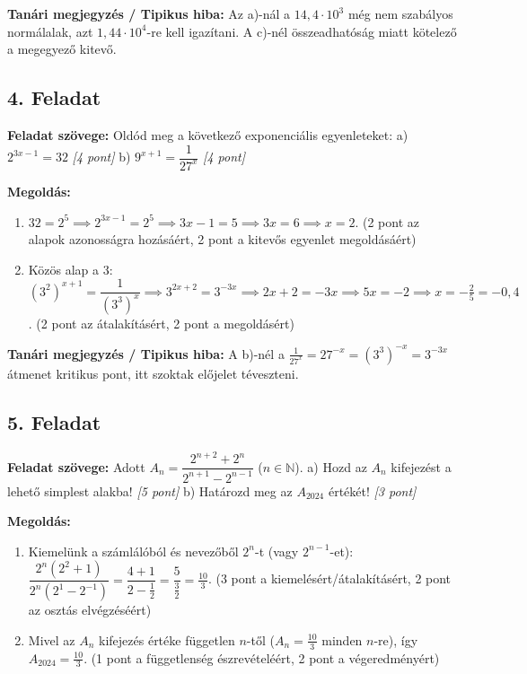 \documentclass[11pt,a4paper]{article}
\begin{document}
\noindent\textbf{Tanári megjegyzés / Tipikus hiba:} 
Az a)-nál a $14,4 \cdot 10^3$ még nem szabályos normálalak, azt $1,44 \cdot 10^4$-re kell igazítani. A c)-nél összeadhatóság miatt kötelező a megegyező kitevő.

\subsection*{4. Feladat}
\textbf{Feladat szövege:} Oldód meg a következő exponenciális egyenleteket:
a) $2^{3x-1} = 32$ \hfill \textit{[4 pont]}
b) $9^{x+1} = \dfrac{1}{27^x}$ \hfill \textit{[4 pont]}

\textbf{Megoldás:}
\begin{enumerate}
    \item[a)] $32 = 2^5 \implies 2^{3x-1} = 2^5 \implies 3x - 1 = 5 \implies 3x = 6 \implies x = 2$. \hfill (2 pont az alapok azonosságra hozásáért, 2 pont a kitevős egyenlet megoldásáért)
    \item[b)] Közös alap a $3$: $(3^2)^{x+1} = \dfrac{1}{(3^3)^x} \implies 3^{2x+2} = 3^{-3x} \implies 2x + 2 = -3x \implies 5x = -2 \implies x = -\frac{2}{5} = -0,4$. \hfill (2 pont az átalakításért, 2 pont a megoldásért)
\end{enumerate}

\noindent\textbf{Tanári megjegyzés / Tipikus hiba:} 
A b)-nél a $\frac{1}{27^x} = 27^{-x} = (3^3)^{-x} = 3^{-3x}$ átmenet kritikus pont, itt szoktak előjelet téveszteni.

\subsection*{5. Feladat}
\textbf{Feladat szövege:} Adott $A_n = \dfrac{2^{n+2} + 2^n}{2^{n+1} - 2^{n-1}}$ ($n \in \mathbb{N}$).
a) Hozd az $A_n$ kifejezést a lehető simplest alakba! \hfill \textit{[5 pont]}
b) Határozd meg az $A_{2024}$ értékét! \hfill \textit{[3 pont]}

\textbf{Megoldás:}
\begin{enumerate}
    \item[a)] Kiemelünk a számlálóból és nevezőből $2^n$-t (vagy $2^{n-1}$-et):
    $\dfrac{2^n(2^2 + 1)}{2^n(2^1 - 2^{-1})} = \dfrac{4 + 1}{2 - \frac{1}{2}} = \dfrac{5}{\frac{3}{2}} = \frac{10}{3}$. \hfill (3 pont a kiemelésért/átalakításért, 2 pont az osztás elvégzéséért)
    \item[b)] Mivel az $A_n$ kifejezés értéke független $n$-től ($A_n = \frac{10}{3}$ minden $n$-re), így $A_{2024} = \frac{10}{3}$. \hfill (1 pont a függetlenség észrevételéért, 2 pont a végeredményért)
\end{enumerate}
\end{document}
